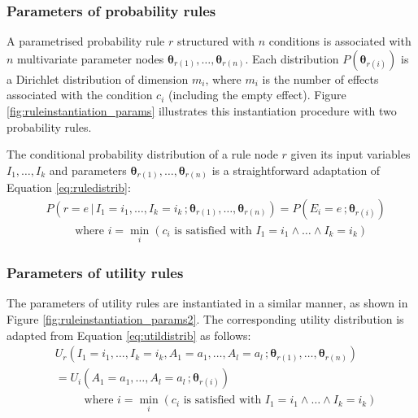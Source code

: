 \subsubsection*{Parameters of probability rules}

A parametrised probability rule $r$ structured with $n$ conditions is associated with $n$ multivariate parameter nodes $\boldsymbol\theta_{r(1)}, \dots, \boldsymbol\theta_{r(n)}$.  Each distribution $P(\boldsymbol\theta_{r(i)})$ is a Dirichlet distribution of dimension $m_i$, where $m_i$ is the number of effects associated with the condition $c_i$ (including the empty effect). Figure \ref{fig:ruleinstantiation_params} illustrates this instantiation procedure with two probability rules.  

The conditional probability distribution of a rule node $r$ given its input variables $I_1, \dots, I_k$ and parameters $\boldsymbol\theta_{r(1)}, \dots, \boldsymbol\theta_{r(n)}$ is a straightforward adaptation of Equation \eqref{eq:ruledistrib}:
\begin{align}
& P(r\!=\!e \, | \, I_1\!=\!i_1, \dots,  I_k\!=\!i_k\,; \boldsymbol\theta_{r(1)}, \dots, \boldsymbol\theta_{r(n)})  = P(E_i = e\,; \boldsymbol\theta_{r(i)}) \\
& \; \; \; \; \; \; \; \; \text{ where } i = \min_i (c_i \text{ is satisfied with } I_1\!=\!i_1 \land \dots \land I_k\!=\!i_k) \nonumber
\end{align}

\subsubsection*{Parameters of utility rules}

The parameters of utility rules are instantiated in a similar manner, as shown in Figure \ref{fig:ruleinstantiation_params2}. The corresponding utility distribution is adapted from Equation \eqref{eq:utildistrib} as follows:
\begin{align}
& U_r(I_1\!=\!i_1, \dots, I_k\!=\!i_k, A_1\!=\!a_1, \dots, A_l\!=\!a_l\,; \boldsymbol\theta_{r(1)}, \dots, \boldsymbol\theta_{r(n)}) \nonumber \\ 
& = U_i(A_1\!=\!a_1, \dots, A_l\!=\!a_l\,; \boldsymbol\theta_{r(i)})  \label{eq:utildistrib_params}\\
& \; \; \; \; \; \; \; \; \text{ where } i = \min_i (c_i \text{ is satisfied with } I_1\!=\!i_1 \land \dots \land I_k\!=\!i_k) \nonumber
\end{align}

